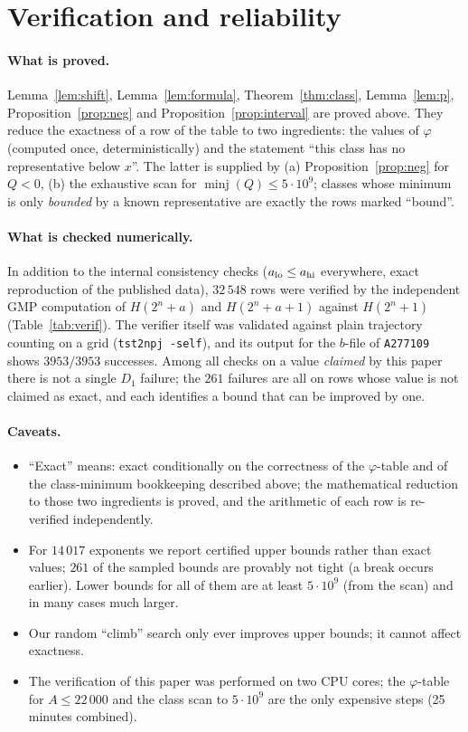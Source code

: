 \documentclass[11pt]{article}
\theoremstyle{remark}
\begin{document}
\section{Verification and reliability}\label{sec:verification}

\paragraph{What is proved.} Lemma~\ref{lem:shift}, Lemma~\ref{lem:formula}, Theorem~\ref{thm:class},
Lemma~\ref{lem:p}, Proposition~\ref{prop:neg} and Proposition~\ref{prop:interval} are proved above.
They reduce the exactness of a row of the table to two ingredients: the values of $\varphi$ (computed
once, deterministically) and the statement ``this class has no representative below $x$''. The latter is
supplied by (a) Proposition~\ref{prop:neg} for $Q<0$, (b) the exhaustive scan for
$\operatorname{minj}(Q)\le5\cdot10^9$; classes whose minimum is only \emph{bounded} by a known
representative are exactly the rows marked ``bound''.

\paragraph{What is checked numerically.} In addition to the internal consistency checks
($a_{\rm lo}\le a_{\rm hi}$ everywhere, exact reproduction of the published data), $32\,548$ rows were
verified by the independent GMP computation of $H(2^n+a)$ and $H(2^n+a+1)$ against $H(2^n+1)$
(Table~\ref{tab:verif}). The verifier itself was validated against plain trajectory counting on a grid
(\texttt{tst2npj -self}), and its output for the $b$-file of \texttt{A277109} shows $3953/3953$
successes. Among all checks on a value \emph{claimed} by this paper there is not a single $D_1$ failure;
the $261$ failures are all on rows whose value is not claimed as exact, and each identifies a bound that
can be improved by one.

\paragraph{Caveats.}
\begin{itemize}\itemsep2pt
\item ``Exact'' means: exact conditionally on the correctness of the $\varphi$-table and of the
class-minimum bookkeeping described above; the mathematical reduction to those two ingredients is
proved, and the arithmetic of each row is re-verified independently.
\item For $14\,017$ exponents we report certified upper bounds rather than exact values; $261$ of the
sampled bounds are provably not tight (a break occurs earlier). Lower bounds for all of them are at
least $5\cdot10^9$ (from the scan) and in many cases much larger.
\item Our random ``climb'' search only ever improves upper bounds; it cannot affect exactness.
\item The verification of this paper was performed on two CPU cores; the $\varphi$-table for
$A\le22\,000$ and the class scan to $5\cdot10^9$ are the only expensive steps (25 minutes combined).
\end{itemize}
\end{document}
